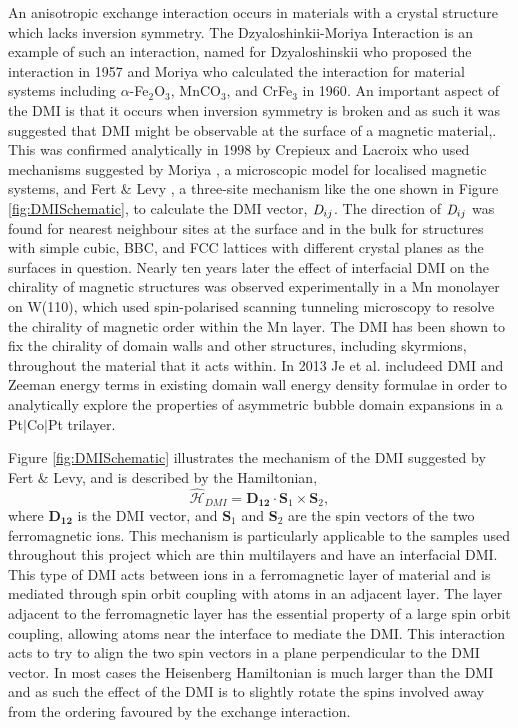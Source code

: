     An anisotropic exchange interaction occurs in materials with a crystal structure which lacks inversion symmetry. The Dzyaloshinkii-Moriya Interaction is an example of such an interaction, named for Dzyaloshinskii who proposed the interaction in 1957\cite{Dzyaloshinskii1958} and Moriya who calculated the interaction for material systems including $\alpha$-Fe$_{2}$O$_{3}$, MnCO$_{3}$, and CrFe$_{3}$ in 1960\cite{Moriya1960}. An important aspect of the DMI is that it occurs when inversion symmetry is broken and as such it was suggested that DMI might be observable at the surface of a magnetic material,\cite{Fert1991}. This was confirmed analytically in 1998 by Crepieux and Lacroix \cite{Crepieux1998} who used mechanisms suggested by Moriya \cite{Moriya1960}, a microscopic model for localised magnetic systems, and Fert \& Levy \cite{Levy1981}, a three-site mechanism like the one shown in Figure \ref{fig:DMISchematic}, to calculate the DMI vector, $\emph{D}_{ij}$. The direction of $\emph{D}_{ij}$ was found for nearest neighbour sites at the surface and in the bulk for structures with simple cubic, BBC, and FCC lattices with different crystal planes as the surfaces in question.\cite{Crepieux1998} Nearly ten years later the effect of interfacial DMI on the chirality of magnetic structures was observed experimentally in a Mn monolayer on W(110), which used spin-polarised scanning tunneling microscopy to resolve the chirality of magnetic order within the Mn layer.\cite{Bode2007} The DMI has been shown to fix the chirality of domain walls and other structures, including skyrmions, throughout the material that it acts within. \cite{Heide2008,Benitez2015} In 2013 Je et al. includeed DMI and Zeeman energy terms in existing domain wall energy density formulae\cite{Lemerle1998,Kim2009} in order to analytically explore the properties of asymmetric bubble domain expansions in a Pt$\lvert$Co$\lvert$Pt trilayer.

    Figure \ref{fig:DMISchematic} illustrates the mechanism of the DMI suggested by Fert \& Levy, and is described by the Hamiltonian,
    \begin{equation}
	    \mathcal{\hat{H}}_{DMI}=\boldsymbol{D_{12}}\cdot\boldsymbol{S}_{1}\times\boldsymbol{S}_{2},
    \end{equation}
    where $\boldsymbol{D_{12}}$ is the DMI vector, and  $\boldsymbol{S}_{1}$ and $\boldsymbol{S}_{2}$ are the spin vectors of the two ferromagnetic ions. This mechanism is particularly applicable to the samples used throughout this project which are thin multilayers and have an interfacial DMI. This type of DMI acts between ions in a ferromagnetic layer of material and is mediated through spin orbit coupling with atoms in an adjacent layer. The layer adjacent to the ferromagnetic layer has the essential property of a large spin orbit coupling, allowing atoms near the interface to mediate the DMI.  This interaction acts to try to align the two spin vectors in a plane perpendicular to the DMI vector. In most cases the Heisenberg Hamiltonian is much larger than the DMI and as such the effect of the DMI is to slightly rotate the spins involved away from the ordering favoured by the exchange interaction.
	
